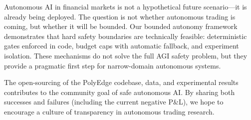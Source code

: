 Autonomous AI in financial markets is not a hypothetical future scenario---it is already being deployed. The question is not whether autonomous trading is coming, but whether it will be bounded. Our bounded autonomy framework demonstrates that hard safety boundaries are technically feasible: deterministic gates enforced in code, budget caps with automatic fallback, and experiment isolation. These mechanisms do not solve the full AGI safety problem, but they provide a pragmatic first step for narrow-domain autonomous systems.

The open-sourcing of the PolyEdge codebase, data, and experimental results contributes to the community goal of safe autonomous AI. By sharing both successes and failures (including the current negative P\&L), we hope to encourage a culture of transparency in autonomous trading research.
